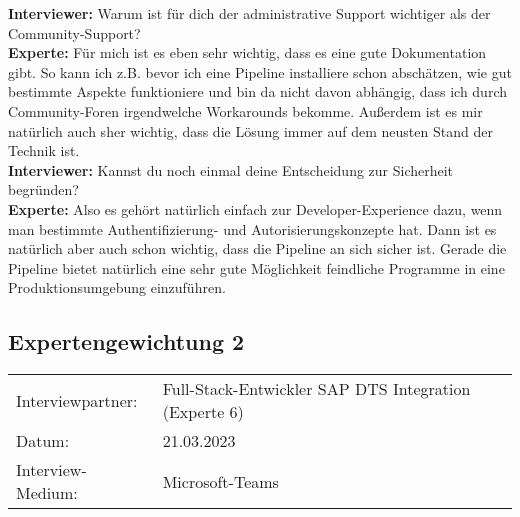 \begin{linenumbers}
            \textbf{Interviewer:} Warum ist für dich der administrative Support wichtiger als der Community-Support?\\
            \textbf{Experte:} Für mich ist es eben sehr wichtig, dass es eine gute Dokumentation gibt. So kann ich z.B. bevor ich eine Pipeline installiere schon abschätzen, wie gut bestimmte Aspekte funktioniere und bin da nicht davon abhängig, dass ich durch Community-Foren irgendwelche Workarounds bekomme. Außerdem ist es mir natürlich auch sher wichtig, dass die Lösung immer auf dem neusten Stand der Technik ist.\\
            \textbf{Interviewer:} Kannst du noch einmal deine Entscheidung zur Sicherheit begründen?\\
            \textbf{Experte:} Also es gehört natürlich einfach zur Developer-Experience dazu, wenn man bestimmte Authentifizierung- und Autorisierungskonzepte hat. Dann ist es natürlich aber auch schon wichtig, dass die Pipeline an sich sicher ist. Gerade die Pipeline bietet natürlich eine sehr gute Möglichkeit feindliche Programme in eine Produktionsumgebung einzuführen.\\
    \end{linenumbers}
    

    
    \newpage
    \subsection{Expertengewichtung 2}
            \begin{tabular}{ l l }
        Interviewpartner: & Full-Stack-Entwickler SAP DTS Integration (Experte 6)\\
        Datum: & 21.03.2023\\
        Interview-Medium: & Microsoft-Teams\\
\end{tabular}
\begin{center}
    \begin{figure}[H]
        \centering
        \label{fig:CEA}
    \end{figure}	
\end{center}
\begin{center}
    \begin{figure}[H]
        \centering
        \label{fig:CEA}
    \end{figure}	
\end{center}

